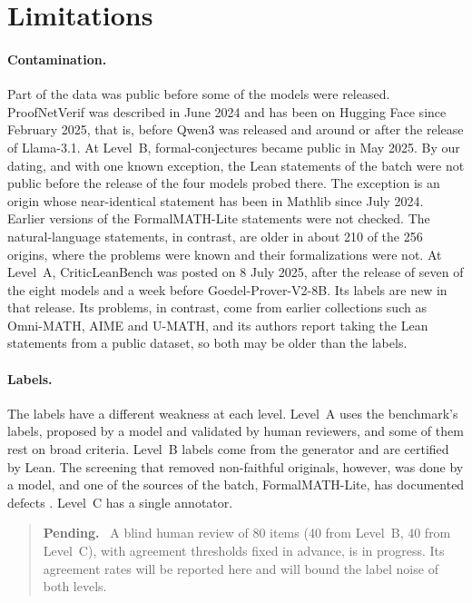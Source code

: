 \documentclass[10pt]{article}
\newenvironment{pendiente}{\begin{quote}\small\noindent\textbf{Pending.}\ }{\end{quote}}
\begin{document}
\section{Limitations}

\paragraph{Contamination.}
Part of the data was public before some of the models were released. ProofNetVerif was described in June 2024 and has been on Hugging Face
since February 2025, that is, before Qwen3 was released and around or after the release of Llama-3.1. At Level~B,
formal-conjectures became public in May 2025. By our dating, and with one known exception, the Lean statements of
the batch were not public before the release of the four models probed there. The exception is an origin whose
near-identical statement has been in Mathlib since July 2024. Earlier versions of the FormalMATH-Lite statements
were not checked. The natural-language statements, in contrast, are older in about 210 of the 256 origins, where
the problems were known and their formalizations were not.
At Level~A, CriticLeanBench was posted on 8 July 2025, after the release of seven of the eight models and a week
before Goedel-Prover-V2-8B. Its labels are new in that release. Its problems, in contrast, come from earlier
collections such as Omni-MATH, AIME and U-MATH, and its authors report taking the Lean statements from a public
dataset, so both may be older than the labels.

\paragraph{Labels.}
The labels have a different weakness at each level. Level~A uses the benchmark's labels, proposed by a model and
validated by human reviewers, and some of them rest on broad criteria. Level~B labels come from the generator and
are certified by Lean. The screening that removed non-faithful originals, however, was done by a model, and one of
the sources of the batch, FormalMATH-Lite, has documented defects \citep{ammanamanchi2026faults}.
Level~C has a single annotator.

\begin{pendiente}
A blind human review of 80 items (40 from Level~B, 40 from Level~C), with agreement thresholds fixed in advance, is
in progress. Its agreement rates will be reported here and will bound the label noise of both levels.
\end{pendiente}
\end{document}

